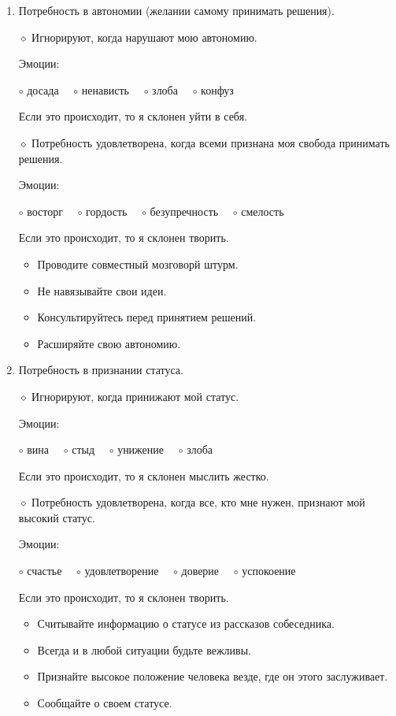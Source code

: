 \documentclass[12pt,a4paper]{report}
\begin{document}
\begin{enumerate}
	\smallskip
	\item Потребность в автономии (желании самому принимать решения).
	
	\medskip
	$\diamond$ Игнорируют, когда нарушают мою автономию.
	
	Эмоции:
	
	$\circ$ досада~~
	$\circ$ ненависть~~
	$\circ$ злоба~~
	$\circ$ конфуз~~
	
	Если это происходит, то я склонен уйти в себя.
	
	\bigskip
	$\diamond$ Потребность удовлетворена, когда всеми признана моя свобода принимать решения.
	
	Эмоции:
	
	$\circ$ восторг~~
	$\circ$ гордость~~
	$\circ$ безупречность~~
	$\circ$ смелость~~
	
	Если это происходит, то я склонен творить.
	
	\smallskip
	\begin{itemize}
		\item Проводите совместный мозговорй штурм.
		\item Не навязывайте свои идеи.
		\item Консультируйтесь перед принятием решений.
		\item Расширяйте свою автономию.
	\end{itemize}

	\smallskip
	\item Потребность в признании статуса.
	
	\medskip
	$\diamond$ Игнорируют, когда принижают мой статус.
	
	Эмоции:
	
	$\circ$ вина~~
	$\circ$ стыд~~
	$\circ$ унижение~~
	$\circ$ злоба~~
	
	Если это происходит, то я склонен мыслить жестко.
	
	\bigskip
	$\diamond$ Потребность удовлетворена, когда все, кто мне нужен, признают мой высокий статус.
	
	Эмоции:
	
	$\circ$ счастье~~
	$\circ$ удовлетворение~~
	$\circ$ доверие~~
	$\circ$ успокоение~~
	
	Если это происходит, то я склонен творить.
	
	\smallskip
	\begin{itemize}
		\item Считывайте информацию о статусе из рассказов собеседника.
		\item Всегда и в любой ситуации будьте вежливы.
		\item Признайте высокое положение человека везде, где он этого заслуживает.
		\item Сообщайте о своем статусе.
	\end{itemize}


\end{enumerate}
\end{document}
